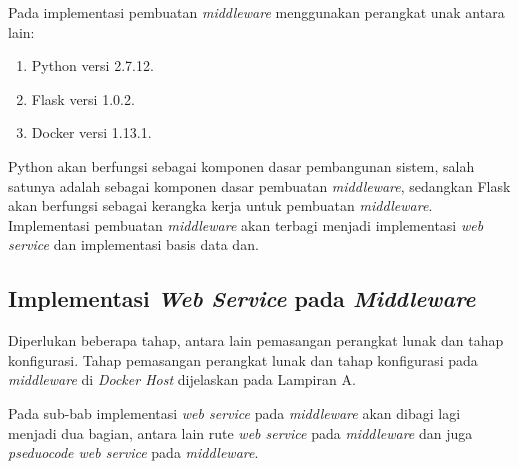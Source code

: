 Pada implementasi pembuatan \textit{middleware} menggunakan perangkat unak antara lain:
\begin{enumerate}
	\item Python versi 2.7.12.
	\item Flask versi 1.0.2.
	\item Docker versi 1.13.1.
\end{enumerate}

Python akan berfungsi sebagai komponen dasar pembangunan sistem, salah satunya adalah sebagai komponen dasar pembuatan \textit{middleware}, sedangkan Flask akan berfungsi sebagai kerangka kerja untuk pembuatan \textit{middleware}. Implementasi pembuatan \textit{middleware} akan terbagi menjadi implementasi \textit{web service} dan implementasi basis data dan.

\subsection{Implementasi \textit{Web Service} pada \textit{Middleware}}
Diperlukan beberapa tahap, antara lain pemasangan perangkat lunak dan tahap konfigurasi. Tahap pemasangan perangkat lunak dan tahap konfigurasi pada \textit{middleware} di \textit{Docker Host} dijelaskan pada Lampiran A.

Pada sub-bab implementasi \textit{web service} pada \textit{middleware} akan dibagi lagi menjadi dua bagian, antara lain rute \textit{web service} pada \textit{middleware} dan juga \textit{pseduocode web service} pada \textit{middleware}.


